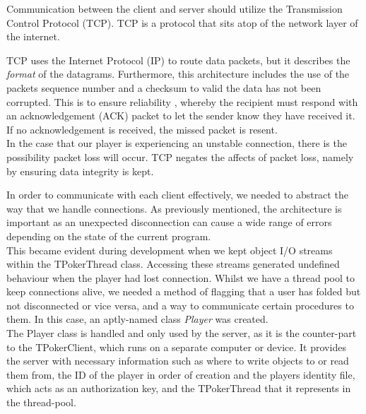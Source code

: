 \documentclass[11pt]{article}
\begin{document}

Communication between the client and server should utilize the Transmission Control Protocol (TCP). 
TCP is a protocol that sits atop of the network layer of the internet. 

TCP uses the Internet Protocol (IP)\cite{ip} to route data packets, but it describes the \textit{format} of the datagrams. Furthermore, this architecture includes the use of the packets sequence number and a checksum to valid the data has not been corrupted. This is to ensure reliability \cite{tcp}, whereby the recipient must respond with an acknowledgement (ACK) packet to let the sender know they have received it. If no acknowledgement is received, the missed packet is resent.\\

In the case that our player is experiencing an unstable connection, there is the possibility packet loss will occur. TCP negates the affects of packet loss, namely by ensuring data integrity is kept.


In order to communicate with each client effectively, we needed to abstract the way that we handle connections. As previously mentioned, the architecture is important as an unexpected disconnection can cause a wide range of errors depending on the state of the current program. \\ %

This became evident during development when we kept object I/O streams within the TPokerThread class. Accessing these streams generated undefined behaviour when the player had lost connection. Whilst we have a thread pool to keep connections alive, we needed a method of flagging that a user has folded but not disconnected or vice versa, and a way to communicate certain procedures to them. In this case, an aptly-named class \textit{Player} was created. \\

The Player class is handled and only used by the server, as it is the counter-part to the TPokerClient, which runs on a separate computer or device. It provides the server with necessary information such as where to write objects to or read them from, the ID of the player in order of creation and the players identity file, which acts as an authorization key, and the TPokerThread that it represents in the thread-pool. 

\newpage

\end{document}
